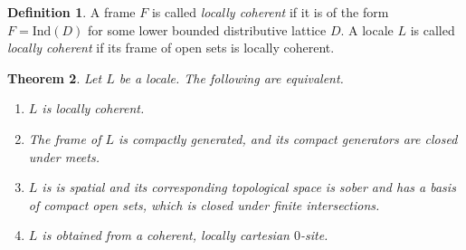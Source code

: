 \documentclass[10pt]{amsart}
\newtheorem{theorem}{Theorem}[section]
\theoremstyle{definition}
\newtheorem{definition}[theorem]{Definition}
\begin{document}
\begin{definition}
A frame $F$ is called \emph{locally coherent} if it is of the form $F = \mathrm{Ind}(D)$ for some lower bounded distributive lattice $D$. A locale $L$ is called \emph{locally coherent} if its frame of open sets is locally coherent.
\end{definition}

\begin{theorem}
Let $L$ be a locale. The following are equivalent.
\begin{enumerate}
\item $L$ is locally coherent.
\item The frame of $L$ is compactly generated, and its compact generators are closed under meets.
\item $L$ is is spatial and its corresponding topological space is sober and has a basis of compact open sets, which is closed under finite intersections.
\item $L$ is obtained from a coherent, locally cartesian $0$-site.
\end{enumerate}
\end{theorem}
\end{document}
